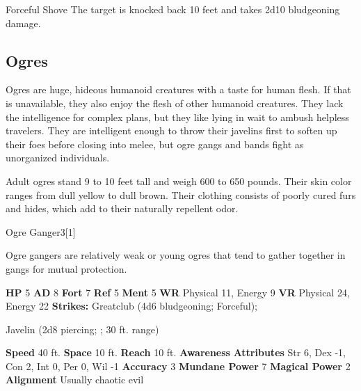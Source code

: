 {{\begin{freeability}{Forceful Shove}
    \hit The target is knocked back 10 feet and takes 2d10 bludgeoning damage.
    \end{freeability}
  
    \subsection{Ogres}
      
    Ogres are huge, hideous humanoid creatures with a taste for human flesh.
    If that is unavailable, they also enjoy the flesh of other humanoid creatures.
    They lack the intelligence for complex plans, but they like lying in wait to ambush helpless travelers.
    They are intelligent enough to throw their javelins first to soften up their foes before closing into melee, but ogre gangs and bands fight as unorganized individuals.

    Adult ogres stand 9 to 10 feet tall and weigh 600 to 650 pounds.
    Their skin color ranges from dull yellow to dull brown.
    Their clothing consists of poorly cured furs and hides, which add to their naturally repellent odor.
  

      

      
  \begin{monsubsection}{Ogre Ganger}{3}[1]
    \vspace{-1em}\vspace{-1em}
    \vspace{0em}

    
        Ogre gangers are relatively weak or young ogres that tend to gather together in gangs for mutual protection.
      
    

    \begin{spellcontent}
      \begin{spelltargetinginfo}
        \pari \textbf{HP} 5 \monsep
          \textbf{AD} 8 \monsep
          \textbf{Fort} 7 \monsep
          \textbf{Ref} 5 \monsep
          \textbf{Ment} 5
        \pari \textbf{WR} Physical 11, Energy 9 \monsep
        \textbf{VR} Physical 24, Energy 22
        \pari \textbf{Strikes:}
            Greatclub  (4d6 bludgeoning; Forceful);
\par Javelin  (2d8 piercing; ; 30 ft. range)
      \end{spelltargetinginfo}
    \end{spellcontent}
    \begin{monsterfooter}
      \pari \textbf{Speed} 40 ft. \monsep
        \textbf{Space} 10 ft. \monsep
        \textbf{Reach} 10 ft.
      \pari \textbf{Awareness} 
      \pari \textbf{Attributes}
        Str 6, Dex -1,
        Con 2, Int 0,
        Per 0, Wil -1
      \pari \textbf{Accuracy} 3 \monsep
        \textbf{Mundane Power} 7 \monsep
      \textbf{Magical Power} 2
      \pari \textbf{Alignment} Usually chaotic evil
    \end{monsterfooter}
  \end{monsubsection}
  
}}
